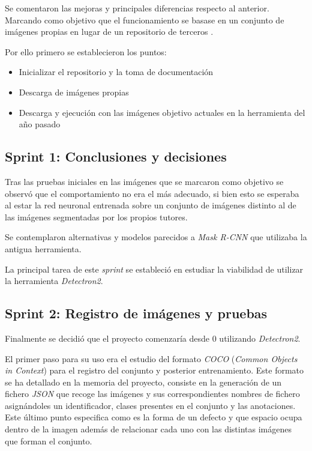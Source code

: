 Se comentaron las mejoras y principales diferencias respecto al anterior. Marcando como objetivo que el funcionamiento se basase en un conjunto de imágenes propias en lugar de un repositorio de terceros \cite{repositorio:ferguson}.

Por ello primero se establecieron los puntos:

\begin{itemize}
    \item Inicializar el repositorio y la toma de documentación
    \item Descarga de imágenes propias
    \item Descarga y ejecución con las imágenes objetivo actuales en la herramienta del año pasado
\end{itemize}

\subsection{Sprint 1: Conclusiones y decisiones}
Tras las pruebas iniciales en las imágenes que se marcaron como objetivo se observó que el comportamiento no era el más adecuado, si bien esto se esperaba al estar la red neuronal entrenada sobre un conjunto de imágenes distinto al de las imágenes segmentadas por los propios tutores.

Se contemplaron alternativas y modelos parecidos a \emph{Mask R-CNN} que utilizaba la antigua herramienta.

La principal tarea de este \emph{sprint} se estableció en estudiar la viabilidad de utilizar la herramienta \emph{Detectron2}. 

\subsection{Sprint 2: Registro de imágenes y pruebas}
Finalmente se decidió que el proyecto comenzaría desde 0 utilizando \emph{Detectron2}.

El primer paso para su uso era el estudio del formato \emph{COCO} (\emph{Common Objects in Context}) para el registro del conjunto y posterior entrenamiento. Este formato se ha detallado en la memoria del proyecto, consiste en la generación de un fichero \emph{JSON} que recoge las imágenes y sus correspondientes nombres de fichero asignándoles un identificador, clases presentes en el conjunto y las anotaciones. Este último punto especifica como es la forma de un defecto y que espacio ocupa dentro de la imagen además de relacionar cada uno con las distintas imágenes que forman el conjunto.

